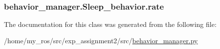 \subsubsection[{\texorpdfstring{rate}{rate}}]{\setlength{\rightskip}{0pt plus 5cm}behavior\+\_\+manager.\+Sleep\+\_\+behavior.\+rate}\hypertarget{classbehavior__manager_1_1Sleep__behavior_a75cca73975838d3ee66cc687726685de}{}\label{classbehavior__manager_1_1Sleep__behavior_a75cca73975838d3ee66cc687726685de}


The documentation for this class was generated from the following file\+:\begin{DoxyCompactItemize}
\item 
/home/my\+\_\+ros/src/exp\+\_\+assignment2/src/\hyperlink{behavior__manager_8py}{behavior\+\_\+manager.\+py}\end{DoxyCompactItemize}

